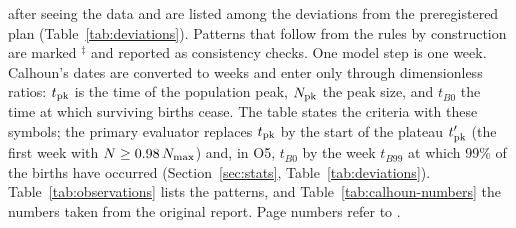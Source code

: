 after seeing the data and are listed among the deviations from the preregistered plan (Table~\ref{tab:deviations}).
Patterns that follow from the rules by construction are marked $^\ddagger$ and reported as consistency checks.
One model step is one week.
Calhoun's dates are converted to weeks and enter only through dimensionless ratios: $t_{\rm pk}$ is the time of the
population peak, $N_{\rm pk}$ the peak size, and $t_{B0}$ the time at which surviving births cease. The table states
the criteria with these symbols; the primary evaluator replaces $t_{\rm pk}$ by the start of the plateau $t'_{\rm pk}$
(the first week with $N\ge0.98\,N_{\rm max}$) and, in O5, $t_{B0}$ by the week $t_{B99}$ at which 99\% of the births
have occurred (Section~\ref{sec:stats}, Table~\ref{tab:deviations}).
Table~\ref{tab:observations} lists the patterns, and Table~\ref{tab:calhoun-numbers} the numbers taken from the
original report.
Page numbers refer to \cite{Calhoun1973}.

